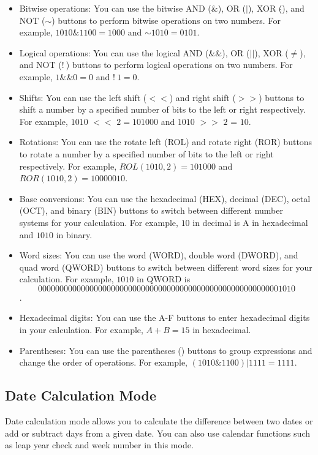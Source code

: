 \documentclass[12pt]{article}
\begin{document}
\begin{itemize}
    \item Bitwise operations: You can use the bitwise AND ($\&$), OR ($|$), XOR ($\hat{}$), and NOT ($\sim$) buttons to perform bitwise operations on two numbers. For example, $1010 \& 1100 = 1000$ and $\sim1010 = 0101$.
    \item Logical operations: You can use the logical AND ($\&\&$), OR ($||$), XOR ($\neq$), and NOT (!$\ $) buttons to perform logical operations on two numbers. For example, $1 \&\& 0 = 0$ and $!\ 1 = 0$.
    \item Shifts: You can use the left shift ($<<$) and right shift ($>>$) buttons to shift a number by a specified number of bits to the left or right respectively. For example, $1010$ $<<$ $2 = 101000$ and $1010$ $>>$ $2$ = $10$.
    \item Rotations: You can use the rotate left (ROL) and rotate right (ROR) buttons to rotate a number by a specified number of bits to the left or right respectively. For example, $ROL(1010,2) = 101000$ and $ROR(1010,2) = 10000010$.
    \item Base conversions: You can use the hexadecimal (HEX), decimal (DEC), octal (OCT), and binary (BIN) buttons to switch between different number systems for your calculation. For example, $10$ in decimal is A in hexadecimal and $1010$ in binary.
    \item Word sizes: You can use the word (WORD), double word (DWORD), and quad word (QWORD) buttons to switch between different word sizes for your calculation. For example, $1010$ in QWORD is $$000000000000000000000000000000000000000000000000000000001010$$.
    \item Hexadecimal digits: You can use the A-F buttons to enter hexadecimal digits in your calculation. For example, $A + B = 15$ in hexadecimal.
    \item Parentheses: You can use the parentheses () buttons to group expressions and change the order of operations. For example, $(1010 \& 1100) | 1111 = 1111$.
\end{itemize}

\pagebreak

\subsection{Date Calculation Mode}
Date calculation mode allows you to calculate the difference between two dates or add or subtract days from a given date. You can also use calendar functions such as leap year check and week number in this mode.
\end{document}
